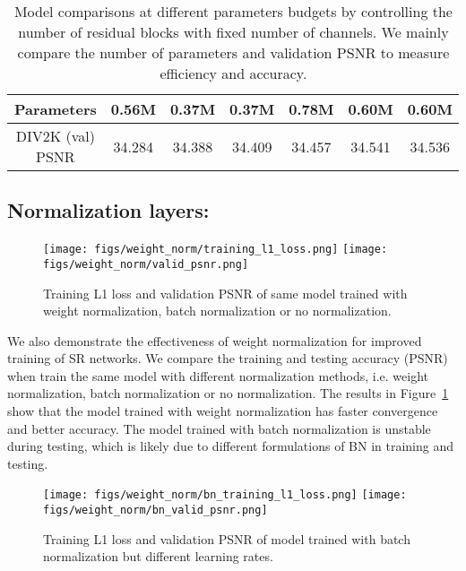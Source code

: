 \documentclass{article}
\begin{document}
\begin{table}[]
\begin{tabular}{ccccccc}
\multicolumn{1}{|c|}{Parameters}       & \multicolumn{1}{c|}{0.56M}   & \multicolumn{1}{c|}{{\color[HTML]{333333} \textbf{0.37M}}} & \multicolumn{1}{c|}{{\color[HTML]{333333} \textbf{0.37M}}} & \multicolumn{1}{c|}{0.78M}   & \multicolumn{1}{c|}{{\color[HTML]{333333} \textbf{0.60M}}} & \multicolumn{1}{c|}{{\color[HTML]{333333} \textbf{0.60M}}} \\ \hline
\multicolumn{1}{|c|}{DIV2K (val) PSNR} & \multicolumn{1}{c|}{34.284} & \multicolumn{1}{c|}{{\color[HTML]{0000FF} 34.388}}        & \multicolumn{1}{c|}{{\color[HTML]{FF0000} 34.409}}        & \multicolumn{1}{c|}{34.457} & \multicolumn{1}{c|}{{\color[HTML]{FF0000} 34.541}}        & \multicolumn{1}{c|}{{\color[HTML]{0000FF} 34.536}}        \\ \hline
\end{tabular}
\vspace{0.2cm}
\caption{Model comparisons at different parameters budgets by controlling the number of residual blocks with fixed number of channels. We mainly compare the number of parameters and validation PSNR to measure efficiency and accuracy.}
\label{figs:wide_activation}
\end{table} 
\subsection{Normalization layers:}

\begin{figure}[h]
\centering
\texttt{[image: figs/weight\_norm/training\_l1\_loss.png]}
\texttt{[image: figs/weight\_norm/valid\_psnr.png]}
\caption{Training L1 loss and validation PSNR of same model trained with weight normalization, batch normalization or no normalization.}
\label{figs:weight_norm}
\end{figure}

We also demonstrate the effectiveness of weight normalization for improved training of SR networks. We compare the training and testing accuracy (PSNR) when train the same model with different normalization methods, i.e. weight normalization, batch normalization or no normalization. The results in Figure~\ref{figs:weight_norm} show that the model trained with weight normalization has faster convergence and better accuracy. The model trained with batch normalization is unstable during testing, which is likely due to different formulations of BN in training and testing.

\begin{figure}[h]
\centering
\texttt{[image: figs/weight\_norm/bn\_training\_l1\_loss.png]}
\texttt{[image: figs/weight\_norm/bn\_valid\_psnr.png]}
\caption{Training L1 loss and validation PSNR of model trained with batch normalization but different learning rates.}
\label{figs:batch_norm}
\end{figure}
\end{document}
